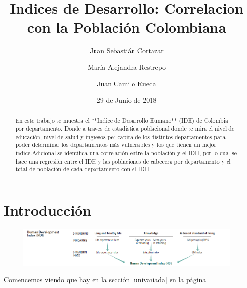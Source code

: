 \documentclass{article}
\title{Indices de Desarrollo: Correlacion con la Población Colombiana}
\author[1]{\normalsize Juan Sebastián Cortazar}
\author[2]{\normalsize María Alejandra Restrepo}
\author[3]{\normalsize Juan Camilo Rueda}
\affil[1,2,3]{\small  Universidad de los Andes\\
\texttt{{js.cortazar533,ma.restrepot,jc.rueda169}@uniandes.edu.col}}
\date{29 de Junio de 2018}
\begin{document}


\maketitle


\begin{abstract}
En este trabajo se muestra el **Indice de Desarrollo Humano** (IDH) de Colombia por departamento. Donde a traves de estadística poblacional donde se mira el nivel de educación, nivel de salud y ingresos per capita de los distintos departamentos para poder determinar los departamentos más vulnerables y los que tienen un mejor indice.Adicional se identifica una correlación entre la población y el IDH, por lo cual se hace una regresión entre el IDH y las poblaciones de cabecera por departamento y el total de población de cada departamento con el IDH. 
\end{abstract}

\section*{Introducción}




\begin{figure}[h]
\centering
\includegraphics{hdiCalc}
\end{figure}


Comencemos viendo que hay en la sección \ref{univariada} en la página \pageref{univariada}.

\clearpage









\end{document}
